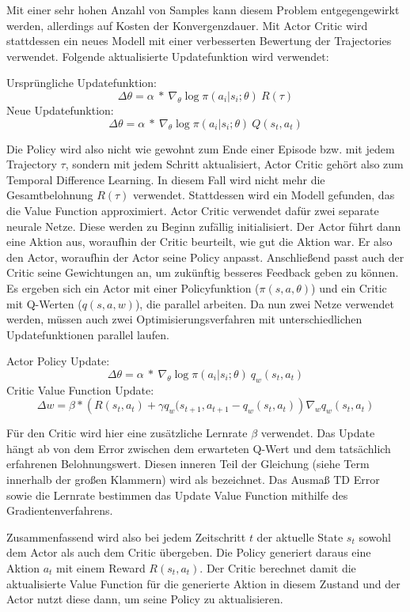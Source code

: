 Mit einer sehr hohen Anzahl von Samples kann diesem Problem entgegengewirkt werden, allerdings auf Kosten der Konvergenzdauer. Mit Actor Critic wird stattdessen ein neues Modell mit einer verbesserten Bewertung der Trajectories verwendet. Folgende aktualisierte Updatefunktion wird verwendet:

Ursprüngliche Updatefunktion:
$$  \Delta \theta   =   \alpha     \: * \:   \nabla_{\theta}   \log \pi(a_i|s_i;\theta)  \: R(\tau) $$
Neue Updatefunktion:
$$  \Delta \theta   =   \alpha     \: * \:   \nabla_{\theta}   \log \pi(a_i|s_i;\theta)  \: Q(s_t, a_t) $$

Die Policy wird also nicht wie gewohnt zum Ende einer Episode bzw. mit jedem Trajectory $\tau$, sondern mit jedem Schritt aktualisiert, Actor Critic gehört also zum Temporal Difference Learning. In diesem Fall wird nicht mehr die Gesamtbelohnung $R(\tau)$ verwendet. Stattdessen wird ein Modell gefunden, das die Value Function approximiert.
Actor Critic verwendet dafür zwei separate neurale Netze. Diese werden zu Beginn zufällig initialisiert. Der Actor führt dann eine Aktion aus, woraufhin der Critic beurteilt, wie gut die Aktion war. Er  also den Actor, woraufhin der Actor seine Policy anpasst. Anschließend passt auch der Critic seine Gewichtungen an, um zukünftig besseres Feedback geben zu können. Es ergeben sich ein Actor mit einer Policyfunktion ($\pi(s,a,\theta)$) und ein Critic mit Q-Werten ($q(s,a,w)$), die parallel arbeiten. Da nun zwei Netze verwendet werden, müssen auch zwei Optimisierungsverfahren mit unterschiedlichen Updatefunktionen parallel laufen.

Actor Policy Update:
$$  \Delta \theta   =   \alpha     \: * \:   \nabla_{\theta}   \log \pi(a_i|s_i;\theta)  \: q_w(s_t, a_t) $$
Critic Value Function Update:
$$ \Delta w  =  \beta  *  \left(     R(s_t,a_t)  + \gamma q_w (s_{t+1}, a_{t+1} - q_w(s_t,a_t)      \right)  \nabla_w  q_w (s_t,a_t)  $$

Für den Critic wird hier eine zusätzliche Lernrate $\beta$ verwendet. Das Update hängt ab von dem Error zwischen dem erwarteten Q-Wert und dem tatsächlich erfahrenen Belohnungswert. Diesen inneren Teil der Gleichung (siehe Term innerhalb der großen Klammern) wird als  bezeichnet. Das Ausmaß TD Error sowie die Lernrate bestimmen das Update Value Function mithilfe des Gradientenverfahrens.

Zusammenfassend wird also bei jedem Zeitschritt $t$ der aktuelle State $s_t$ sowohl dem Actor als auch dem Critic übergeben. Die Policy generiert daraus eine Aktion $a_t$ mit einem Reward $R(s_t,a_t)$. Der Critic berechnet damit die aktualisierte Value Function für die generierte Aktion in diesem Zustand und der Actor nutzt diese dann, um seine Policy zu aktualisieren.

